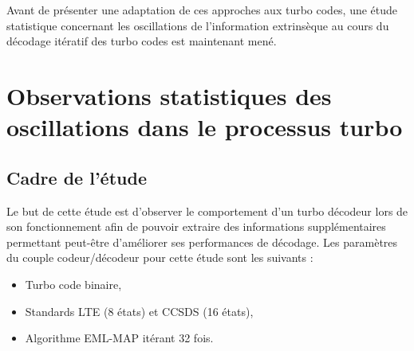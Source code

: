Avant de présenter une adaptation de ces approches aux turbo codes, une étude statistique concernant les oscillations 
de l'information extrinsèque au cours du décodage itératif des turbo codes est maintenant mené.

\section{Observations statistiques des oscillations dans le processus turbo}

\subsection{Cadre de l'étude}
Le but de cette étude est d'observer le comportement d'un turbo décodeur lors de son fonctionnement afin de pouvoir 
extraire des informations supplémentaires permettant peut-être d'améliorer ses performances de décodage.
Les paramètres du couple codeur/décodeur pour cette étude sont les suivants :
\begin{itemize}
	\item Turbo code binaire,
	\item Standards LTE (8 états) et CCSDS (16 états),
	\item Algorithme EML-MAP itérant 32 fois.\newline
\end{itemize}



